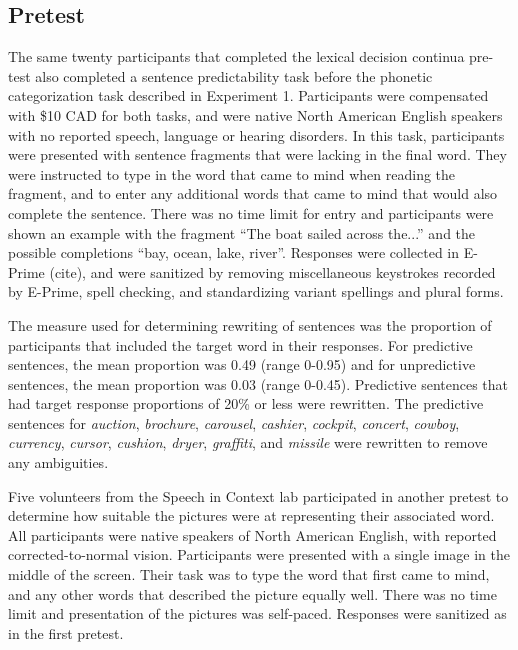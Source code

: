 \subsection{Pretest}

The same twenty participants that completed the lexical decision continua pre-test also completed a sentence predictability task before the phonetic categorization task described in Experiment 1. 
Participants were compensated with \$10 CAD for both tasks, and were native North American English speakers with no reported speech, language or hearing disorders. In this task, participants were presented with sentence fragments that were lacking in the final word.  
They were instructed to type in the word that came to mind when reading the fragment, and to enter any additional words that came to mind that would also complete the sentence.  
There was no time limit for entry and participants were shown an example with the fragment ``The boat sailed across the...'' and the possible completions ``bay, ocean, lake, river''.  
Responses were collected in E-Prime (cite), and were sanitized by removing miscellaneous keystrokes recorded by E-Prime, spell checking, and standardizing variant spellings and plural forms.

The measure used for determining rewriting of sentences was the proportion of participants that included the target word in their responses.  
For predictive sentences, the mean proportion was 0.49 (range 0-0.95) and for unpredictive sentences, the mean proportion was 0.03 (range 0-0.45).  
Predictive sentences that had target response proportions of 20\% or less were rewritten.  
The predictive sentences for \emph{auction}, \emph{brochure}, \emph{carousel}, \emph{cashier}, \emph{cockpit}, \emph{concert}, \emph{cowboy}, \emph{currency}, \emph{cursor}, \emph{cushion}, \emph{dryer}, \emph{graffiti}, and \emph{missile} were rewritten to remove any ambiguities.  

Five volunteers from the Speech in Context lab participated in another pretest to determine how suitable the pictures were at representing their associated word.  
All participants were native speakers of North American English, with reported corrected-to-normal vision. Participants were presented with a single image in the middle of the screen.  
Their task was to type the word that first came to mind, and any other words that described the picture equally well.  
There was no time limit and presentation of the pictures was self-paced. Responses were sanitized as in the first pretest.  

